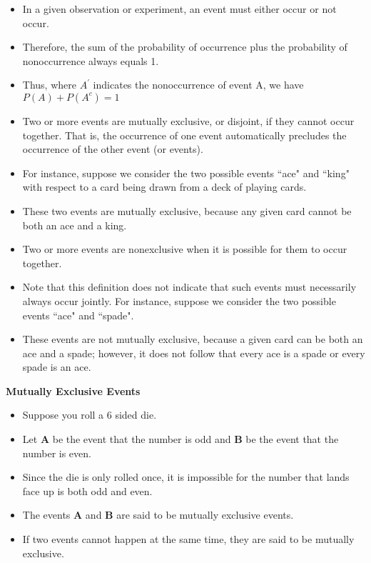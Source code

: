 \documentclass[]{report}
\begin{document}
\begin{itemize}
\item In a given observation or experiment, an event must either occur or not occur. \item Therefore, the sum of the
probability of occurrence plus the probability of nonoccurrence always equals 1. \item Thus, where $A^{\prime}$ indicates the nonoccurrence of event A, we have
$P(A) + P(A^{c}) =  1$

\item 
Two or more events are mutually exclusive, or disjoint, if they cannot occur together. That is, the occurrence
of one event automatically precludes the occurrence of the other event (or events). 
\item For instance, suppose we
consider the two possible events ``ace" and ``king" with respect to a card being drawn from a deck of playing
cards. 
\item These two events are mutually exclusive, because any given card cannot be both an ace and a king.
\item Two or more events are nonexclusive when it is possible for them to occur together.

\item Note that this definition does not indicate that such events must necessarily always occur jointly. For instance, suppose we consider the two possible events ``ace" and ``spade". 
\item These events are not mutually exclusive, because a given card can be both an ace and a spade; however, it does not follow that every ace is a spade or every spade is an ace.
\end{itemize}
\noindent \textbf{Mutually Exclusive Events}

\begin{itemize}
\item Suppose you roll a 6 sided die. \item Let \textbf{A} be the event that the number is odd and \textbf{B} be the event that the number is even. 
\item Since the die is only rolled once, it is impossible for the number that lands face up is both odd and even. \item The events \textbf{A} and \textbf{B} are said to be mutually exclusive events. \item If two events cannot happen at the same time, they are said to be mutually exclusive.


\end{itemize}
\end{document}
